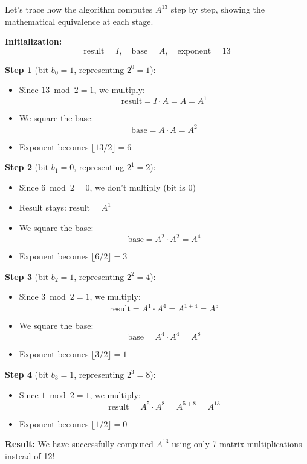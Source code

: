 \documentclass{article}
\begin{document}
	Let's trace how the algorithm computes $A^{13}$ step by step, showing the mathematical equivalence at each stage.
	
	\textbf{Initialization:}
	\[
	\text{result} = I, \quad \text{base} = A, \quad \text{exponent} = 13
	\]
	
	\textbf{Step 1} (bit $b_0 = 1$, representing $2^0 = 1$):
	\begin{itemize}
		\item Since $13 \bmod 2 = 1$, we multiply:
		\[
		\text{result} = I \cdot A = A = A^1
		\]
		\item We square the base:
		\[
		\text{base} = A \cdot A = A^2
		\]
		\item Exponent becomes $\lfloor 13/2 \rfloor = 6$
	\end{itemize}
	
	\textbf{Step 2} (bit $b_1 = 0$, representing $2^1 = 2$):
	\begin{itemize}
		\item Since $6 \bmod 2 = 0$, we don't multiply (bit is 0)
		\item Result stays: $\text{result} = A^1$
		\item We square the base:
		\[
		\text{base} = A^2 \cdot A^2 = A^4
		\]
		\item Exponent becomes $\lfloor 6/2 \rfloor = 3$
	\end{itemize}
	
	\textbf{Step 3} (bit $b_2 = 1$, representing $2^2 = 4$):
	\begin{itemize}
		\item Since $3 \bmod 2 = 1$, we multiply:
		\[
		\text{result} = A^1 \cdot A^4 = A^{1+4} = A^5
		\]
		\item We square the base:
		\[
		\text{base} = A^4 \cdot A^4 = A^8
		\]
		\item Exponent becomes $\lfloor 3/2 \rfloor = 1$
	\end{itemize}
	
	\textbf{Step 4} (bit $b_3 = 1$, representing $2^3 = 8$):
	\begin{itemize}
		\item Since $1 \bmod 2 = 1$, we multiply:
		\[
		\text{result} = A^5 \cdot A^8 = A^{5+8} = A^{13}
		\]
		\item Exponent becomes $\lfloor 1/2 \rfloor = 0$
	\end{itemize}
	
	\textbf{Result:} We have successfully computed $A^{13}$ using only 7 matrix multiplications instead of 12!
	
\end{document}
